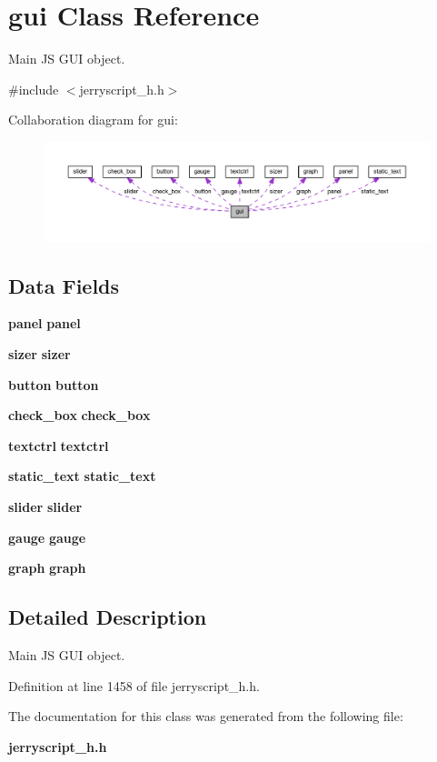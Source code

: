 \section{gui Class Reference}
\label{classgui}


Main JS G\+UI object.  




{\ttfamily \#include $<$jerryscript\+\_\+h.\+h$>$}



Collaboration diagram for gui\+:\nopagebreak
\begin{figure}[H]
\begin{center}
\leavevmode
\includegraphics[width=350pt]{classgui__coll__graph}
\end{center}
\end{figure}
\subsection*{Data Fields}
\begin{DoxyCompactItemize}
\item 
\mbox{\label{classgui_a5865d95b775346aee2512dec1b27701f}} 
\textbf{ panel} {\bfseries panel}
\item 
\mbox{\label{classgui_aa6a729e4fc40c42b5a0b572302e714df}} 
\textbf{ sizer} {\bfseries sizer}
\item 
\mbox{\label{classgui_a9d9f18ad7021aaf102ccc991439eb6fb}} 
\textbf{ button} {\bfseries button}
\item 
\mbox{\label{classgui_ad51c81be1a96dbb9e6393615d1dc77b4}} 
\textbf{ check\+\_\+box} {\bfseries check\+\_\+box}
\item 
\mbox{\label{classgui_af2fb20dbecb7ec6c3125f354d56bbb5f}} 
\textbf{ textctrl} {\bfseries textctrl}
\item 
\mbox{\label{classgui_a4b00419b90d4fab69c342922abe0ac18}} 
\textbf{ static\+\_\+text} {\bfseries static\+\_\+text}
\item 
\mbox{\label{classgui_a0b517e9ac438dbad32a8405260f3e739}} 
\textbf{ slider} {\bfseries slider}
\item 
\mbox{\label{classgui_a1e350661061c75e580e13d87b9710f4f}} 
\textbf{ gauge} {\bfseries gauge}
\item 
\mbox{\label{classgui_a7d931efceb60400ac611d573ac0a9e99}} 
\textbf{ graph} {\bfseries graph}
\end{DoxyCompactItemize}


\subsection{Detailed Description}
Main JS G\+UI object. 

Definition at line 1458 of file jerryscript\+\_\+h.\+h.



The documentation for this class was generated from the following file\+:\begin{DoxyCompactItemize}
\item 
\textbf{ jerryscript\+\_\+h.\+h}\end{DoxyCompactItemize}
